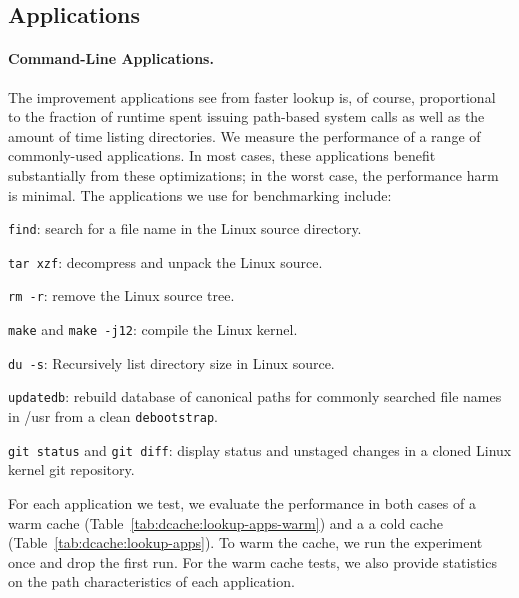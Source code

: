 \subsection{Applications}

\paragraph{Command-Line Applications.}
The improvement applications see from faster lookup is, of course, proportional 
to the fraction of runtime spent issuing path-based system calls as well as the amount of time
listing directories.
We measure the performance of a range of commonly-used applications.
In most cases, these applications benefit substantially from these optimizations;
in the worst case, the performance harm is minimal.
The applications we use for benchmarking include:
\begin{compactitem}
\item {\tt find}: search for a file name in the Linux source directory.
\item {\tt tar xzf}: decompress and unpack the Linux source.
\item {\tt rm -r}: remove the Linux source tree.
\item {\tt make} and {\tt make -j12}: compile the Linux kernel.
\item {\tt du -s}: Recursively list directory size in Linux source.
\item {\tt updatedb}: rebuild database of canonical paths for commonly searched file names in /usr from a clean {\tt debootstrap}.
\item {\tt git status} and {\tt git diff}: display status and unstaged changes in a cloned Linux kernel git repository.
\end{compactitem}
For each application we test, we evaluate the performance in both cases of 
a warm cache (Table~\ref{tab:dcache:lookup-apps-warm}) and a
a cold cache (Table~\ref{tab:dcache:lookup-apps}).
To warm the cache, we run the experiment once and drop the first run.
For the warm cache tests, we also provide statistics on the path characteristics of each application.

